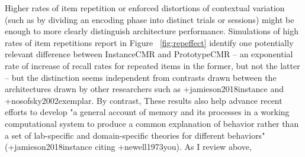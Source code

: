 {}Higher rates of item repetition or enforced distortions of contextual variation (such as by dividing an encoding phase into distinct trials or sessions) might be enough to more clearly distinguish architecture performance. Simulations of high rates of item repetitions report in Figure ~\ref{fig:repeffect} identify one potentially relevant difference between InstanceCMR and PrototypeCMR -- an exponential rate of increase of recall rates for repeated items in the former, but not the latter -- but the distinction seems independent from contrasts drawn between the architectures drawn by other researchers such as +{}{}{jamieson2018instance} and +{}{}{nosofsky2002exemplar}. By contrast, \markdownRendererInterblockSeparator
{}These results also help advance recent efforts to develop "a general account of memory and its processes in a working computational system to produce a common explanation of behavior rather than a set of lab-specific and domain-specific theories for different behaviors" (+{}{}{jamieson2018instance} citing +{}{}{newell1973you}). As I review above, \relax